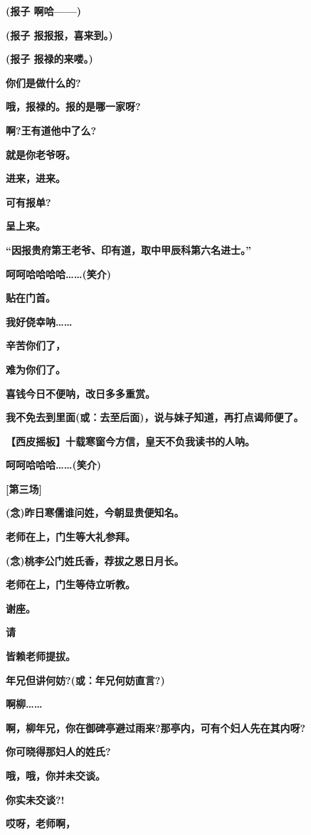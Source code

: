 \textbf{(报子 啊哈------)}

\textbf{(报子 报报报，喜来到。)}

\textbf{(报子 报禄的来喽。)}

\textbf{你们是做什么的?}

\textbf{哦，报禄的。报的是哪一家呀?}

\textbf{啊?王有道他中了么?}

\textbf{就是你老爷呀。}

\textbf{进来，进来。}

\textbf{可有报单?}

\textbf{呈上来。}

\textbf{``因报贵府第王老爷、印有道，取中甲辰科第六名进士。''}

\textbf{呵呵哈哈哈哈\ldots{}\ldots{}(笑介)}

\textbf{贴在门首。}

\textbf{我好侥幸呐\ldots{}\ldots{}}

\textbf{辛苦你们了，}

\textbf{难为你们了。}

\textbf{喜钱今日不便呐，改日多多重赏。}

\textbf{我不免去到里面(或：去至后面)，说与妹子知道，再打点谒师便了。}

\textbf{【西皮摇板】十载寒窗今方信，皇天不负我读书的人呐。}

\textbf{呵呵哈哈哈\ldots{}\ldots{}(笑介)}

\textbf{{[}第三场{]}}

\textbf{(念)昨日寒儒谁问姓，今朝显贵便知名。}

\textbf{老师在上，门生等大礼参拜。}

\textbf{(念)桃李公门姓氏香，荐拔之恩日月长。}

\textbf{老师在上，门生等侍立听教。}

\textbf{谢座。}

\textbf{请}

\textbf{皆赖老师提拔。}

\textbf{年兄但讲何妨?(或：年兄何妨直言?)}

\textbf{啊柳\ldots{}\ldots{}}

\textbf{啊，柳年兄，你在御碑亭避过雨来?那亭内，可有个妇人先在其内呀?}

\textbf{你可晓得那妇人的姓氏?}

\textbf{哦，哦，你并未交谈。}

\textbf{你实未交谈?!}

\textbf{哎呀，老师啊，}

